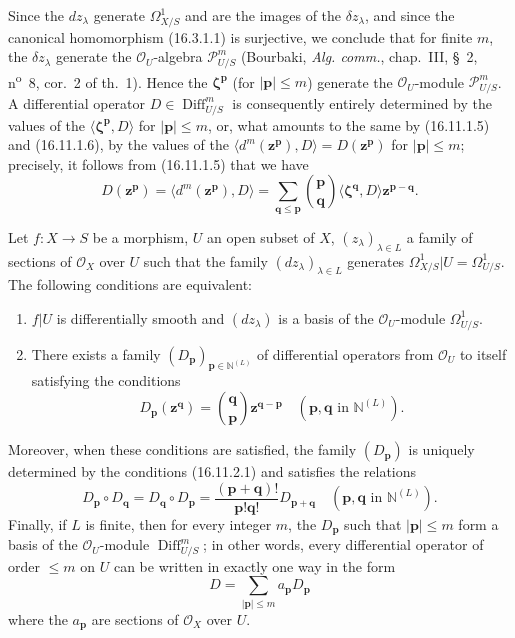 \begin{env}[16.11.1]
Since the $dz_\lambda$ generate $\Omega_{X/S}^1$ and are the images of the
$\delta z_\lambda$, and since the canonical homomorphism (16.3.1.1) is
surjective, we conclude that for finite $m$, the $\delta z_\lambda$ generate
the $\mathcal{O}_U$-algebra $\mathscr{P}_{U/S}^m$ (Bourbaki,
\emph{Alg. comm.}, chap.~III, §~2, n\textsuperscript{o}~8, cor.~2 of th.~1).
Hence the $\boldsymbol{\zeta}^{\mathbf{p}}$ (for $|\mathbf{p}|\leq m$)
generate the $\mathcal{O}_U$-module $\mathscr{P}_{U/S}^m$. A differential
operator $D\in\operatorname{Diff}_{U/S}^m$ is consequently entirely
determined by the values of the
$\langle\boldsymbol{\zeta}^{\mathbf{p}},D\rangle$ for
$|\mathbf{p}|\leq m$, or, what amounts to the same by (16.11.1.5) and
(16.11.1.6), by the values
of the $\langle d^m(\mathbf{z}^{\mathbf{p}}),D\rangle=D(\mathbf{z}^{\mathbf{p}})$
for $|\mathbf{p}|\leq m$; precisely, it follows from (16.11.1.5) that
we have
\[
  D(\mathbf{z}^{\mathbf{p}})
  =\langle d^m(\mathbf{z}^{\mathbf{p}}),D\rangle
  =\sum_{\mathbf{q}\leq\mathbf{p}}
    \binom{\mathbf{p}}{\mathbf{q}}
    \langle\boldsymbol{\zeta}^{\mathbf{q}},D\rangle
    \mathbf{z}^{\mathbf{p}-\mathbf{q}}.
  \tag{16.11.1.7}
  \label{IV.16.11.1.7}
\]
\end{env}

\begin{theorem}[16.11.2]
\label{IV.16.11.2}
Let $f:X\to S$ be a morphism, $U$ an open subset of $X$,
$(z_\lambda)_{\lambda\in L}$ a family of sections of $\mathcal{O}_X$
over $U$ such that the family $(dz_\lambda)_{\lambda\in L}$ generates
$\Omega_{X/S}^1|U=\Omega_{U/S}^1$. The following conditions are
equivalent:
\begin{enumerate}
  \item[a)] $f|U$ is differentially smooth and $(dz_\lambda)$ is a basis
  of the $\mathcal{O}_U$-module $\Omega_{U/S}^1$.
  \item[b)] There exists a family
  $(D_{\mathbf{p}})_{\mathbf{p}\in\mathbb{N}^{(L)}}$ of differential
  operators from $\mathcal{O}_U$ to itself satisfying the conditions
  \[
    D_{\mathbf{p}}(\mathbf{z}^{\mathbf{q}})
    =\binom{\mathbf{q}}{\mathbf{p}}
      \mathbf{z}^{\mathbf{q}-\mathbf{p}}
    \quad(\mathbf{p},\mathbf{q}\text{ in }\mathbb{N}^{(L)}).
    \tag{16.11.2.1}
    \label{IV.16.11.2.1}
  \]
\end{enumerate}
Moreover, when these conditions are satisfied, the family
$(D_{\mathbf{p}})$ is uniquely determined by the conditions
(16.11.2.1) and satisfies the relations
\[
  D_{\mathbf{p}}\circ D_{\mathbf{q}}
  =D_{\mathbf{q}}\circ D_{\mathbf{p}}
  =\frac{(\mathbf{p}+\mathbf{q})!}{\mathbf{p}!\mathbf{q}!}
    D_{\mathbf{p}+\mathbf{q}}
  \quad(\mathbf{p},\mathbf{q}\text{ in }\mathbb{N}^{(L)}).
  \tag{16.11.2.2}
  \label{IV.16.11.2.2}
\]
Finally, if $L$ is finite, then for every integer $m$, the $D_{\mathbf{p}}$
such that $|\mathbf{p}|\leq m$ form a basis of the $\mathcal{O}_U$-module
$\operatorname{Diff}_{U/S}^m$; in other words, every differential operator
of order $\leq m$ on $U$ can be written in exactly one way in the form
\[
  D=\sum_{|\mathbf{p}|\leq m}a_{\mathbf{p}}D_{\mathbf{p}}
\]
where the $a_{\mathbf{p}}$ are sections of $\mathcal{O}_X$ over
$U$.
\end{theorem}

